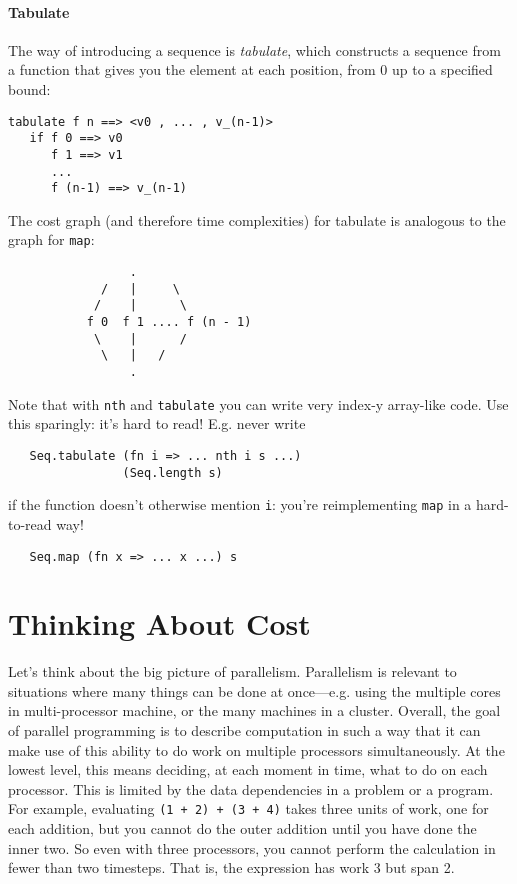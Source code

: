 \paragraph{Tabulate}
The way of introducing a sequence is \emph{tabulate}, which constructs a
sequence from a function that gives you the element at each position,
from $0$ up to a specified bound:

\begin{verbatim}
tabulate f n ==> <v0 , ... , v_(n-1)>
   if f 0 ==> v0
      f 1 ==> v1
      ...
      f (n-1) ==> v_(n-1)
\end{verbatim}

The cost graph (and therefore time complexities) for tabulate is analogous to the graph for \verb|map|:
\begin{verbatim}
                 .
             /   |     \
            /    |      \
           f 0  f 1 .... f (n - 1)
            \    |      /
             \   |   /
                 .
\end{verbatim}



Note that with \verb|nth| and \verb|tabulate| you can write very index-y
array-like code.  Use this sparingly: it's hard to read!  E.g. never
write
\begin{verbatim}
   Seq.tabulate (fn i => ... nth i s ...)
                (Seq.length s)
\end{verbatim}
if the function doesn't otherwise mention \verb|i|: you're
reimplementing \verb|map| in a hard-to-read way!
\begin{verbatim}
   Seq.map (fn x => ... x ...) s
\end{verbatim}



\section{Thinking About Cost}

Let's think about the big picture of parallelism.
Parallelism is relevant to situations where many things can be done at
once---e.g. using the multiple cores in multi-processor machine, or the
many machines in a cluster. Overall, the goal of parallel programming is to
describe computation in such a way that it can make use of this ability to
do work on multiple processors simultaneously.  At the lowest level, this
means deciding, at each moment in time, what to do on each processor.  This
is limited by the data dependencies in a problem or a program.  For
example, evaluating \verb|(1 + 2) + (3 + 4)| takes three units of work, one
for each addition, but you cannot do the outer addition until you have done
the inner two.  So even with three processors, you cannot perform the
calculation in fewer than two timesteps.  That is, the expression has work
3 but span 2.

